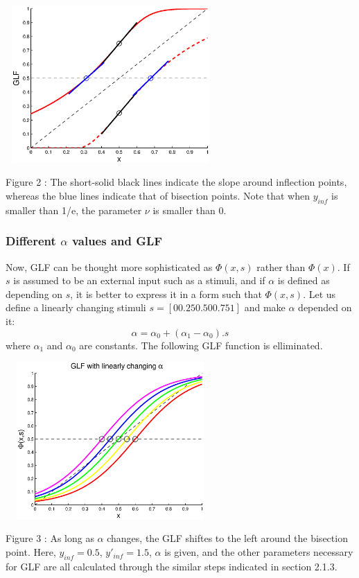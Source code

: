 \documentclass[twocolumn]{article}
\begin{document}
\begin{center}
\includegraphics[width=80mm,height=60mm]{glf_first.eps} 
   \begin{footnotesize} Figure 2 : The short-solid black lines indicate the slope around inflection points, whereas the blue lines indicate that of bisection points. Note that when $y_{inf}$ is smaller than 1/e, the parameter $\nu$ is smaller than 0.  \end{footnotesize}
\end{center}

\subsubsection{Different $\alpha$ values and GLF }

Now, GLF can be thought more sophisticated as $\Phi(x,s)$ rather than $\Phi(x)$. If $s$ is assumed to be an external input such as a stimuli, and if $\alpha$ is defined as depending on $s$, it is better to express it in a form such that $\Phi(x,s)$. Let us define a linearly changing stimuli  $s=[0 0.25 0.50 0.75 1]$ and make $\alpha$ depended on it:
\begin{equation}
 \alpha=\alpha_0+(\alpha_1-\alpha_0).s
\end{equation}
where $\alpha_1$ and $\alpha_0$ are constants. The following GLF function is elliminated. 

\begin{center}
\includegraphics[width=80mm,height=60mm]{linear_alpha.eps} 
   \begin{footnotesize} Figure 3 : As long as $\alpha$ changes, the GLF shiftes to the left around the bisection point. Here, $y_{inf}=0.5$, $y'_{inf}=1.5$, $\alpha$ is given, and the other parameters necessary for GLF are all calculated through the similar steps indicated in section 2.1.3. \end{footnotesize}
\end{center}
\end{document}
